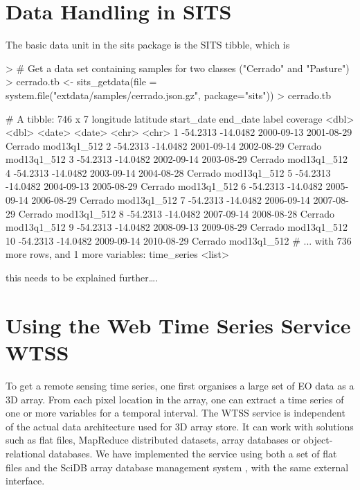 \documentclass[article]{jss}
\begin{document}
\section{Data Handling in SITS}\label{data-handling-in-sits}

The basic data unit in the sits package is the SITS tibble, which is

\begin{CodeChunk}

\begin{CodeInput}
> # Get a data set containing samples for two classes ("Cerrado" and "Pasture")
> cerrado.tb <- sits_getdata(file = system.file("extdata/samples/cerrado.json.gz", package="sits"))
> cerrado.tb
\end{CodeInput}

\begin{CodeOutput}
# A tibble: 746 x 7
   longitude latitude start_date   end_date   label    coverage
       <dbl>    <dbl>     <date>     <date>   <chr>       <chr>
 1  -54.2313 -14.0482 2000-09-13 2001-08-29 Cerrado mod13q1_512
 2  -54.2313 -14.0482 2001-09-14 2002-08-29 Cerrado mod13q1_512
 3  -54.2313 -14.0482 2002-09-14 2003-08-29 Cerrado mod13q1_512
 4  -54.2313 -14.0482 2003-09-14 2004-08-28 Cerrado mod13q1_512
 5  -54.2313 -14.0482 2004-09-13 2005-08-29 Cerrado mod13q1_512
 6  -54.2313 -14.0482 2005-09-14 2006-08-29 Cerrado mod13q1_512
 7  -54.2313 -14.0482 2006-09-14 2007-08-29 Cerrado mod13q1_512
 8  -54.2313 -14.0482 2007-09-14 2008-08-28 Cerrado mod13q1_512
 9  -54.2313 -14.0482 2008-09-13 2009-08-29 Cerrado mod13q1_512
10  -54.2313 -14.0482 2009-09-14 2010-08-29 Cerrado mod13q1_512
# ... with 736 more rows, and 1 more variables: time_series <list>
\end{CodeOutput}
\end{CodeChunk}

this needs to be explained further\ldots{}.

\section{Using the Web Time Series Service
WTSS}\label{using-the-web-time-series-service-wtss}

To get a remote sensing time series, one first organises a large set of
EO data as a 3D array. From each pixel location in the array, one can
extract a time series of one or more variables for a temporal interval.
The WTSS service is independent of the actual data architecture used for
3D array store. It can work with solutions such as flat files, MapReduce
distributed datasets, array databases or object-relational databases. We
have implemented the service using both a set of flat files and the
SciDB array database management system \citep{Stonebraker2013}, with the
same external interface.
\end{document}
